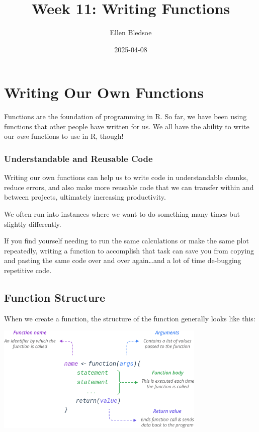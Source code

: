 \documentclass[
]{article}
\title{Week 11: Writing Functions}
\author{Ellen Bledsoe}
\date{2025-04-08}
\begin{document}
\maketitle

\section{Writing Our Own Functions}\label{writing-our-own-functions}

Functions are the foundation of programming in R. So far, we have been
using functions that other people have written for us. We all have the
ability to write our \emph{own} functions to use in R, though!

\subsubsection{Understandable and Reusable
Code}\label{understandable-and-reusable-code}

Writing our own functions can help us to write code in understandable
chunks, reduce errors, and also make more reusable code that we can
transfer within and between projects, ultimately increasing
productivity.

We often run into instances where we want to do something many times but
slightly differently.

If you find yourself needing to run the same calculations or make the
same plot repeatedly, writing a function to accomplish that task can
save you from copying and pasting the same code over and over
again\ldots and a lot of time de-bugging repetitive code.

\subsection{Function Structure}\label{function-structure}

When we create a function, the structure of the function generally looks
like this:

\includegraphics[width=0.75\textwidth,height=\textheight]{images/r-function-syntax.png}
\end{document}
